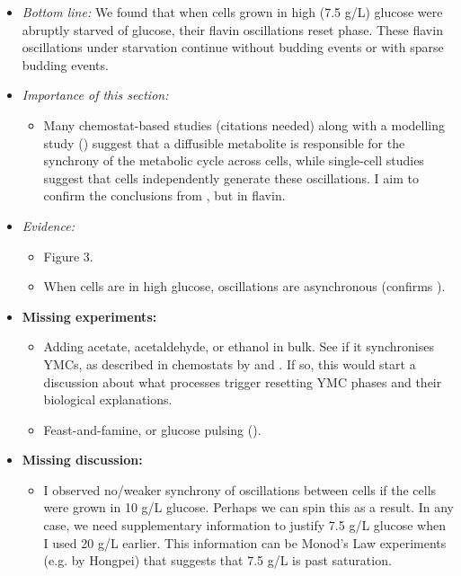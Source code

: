 \begin{itemize}
\item \emph{Bottom line:} We found that when cells grown in high (7.5 g/L) glucose were abruptly starved of glucose, their flavin oscillations reset phase.  These flavin oscillations under starvation continue without budding events or with sparse budding events.
\item \emph{Importance of this section:}

\begin{itemize}
\item Many chemostat-based studies (citations needed) along with a modelling study (\textcite{krishnaMinimalPushPull2018}) suggest that a diffusible metabolite is responsible for the synchrony of the metabolic cycle across cells, while single-cell studies suggest that cells independently generate these oscillations.  I aim to confirm the conclusions from \textcite{papagiannakisAutonomousMetabolicOscillations2017}, but in flavin.
\end{itemize}
\item \emph{Evidence:}
\begin{itemize}
\item Figure 3.
\item When cells are in high glucose, oscillations are asynchronous (confirms \textcite{papagiannakisAutonomousMetabolicOscillations2017,baumgartnerFlavinbasedMetabolicCycles2018}).
\end{itemize}

\item \textbf{Missing experiments:}
\begin{itemize}
\item Adding acetate, acetaldehyde, or ethanol in bulk.  See if it synchronises YMCs, as described in chemostats by \textcite{kuangMsn2RegulateExpression2017} and \textcite{krishnaMinimalPushPull2018} .  If so, this would start a discussion about what processes trigger resetting YMC phases and their biological explanations.
\item Feast-and-famine, or glucose pulsing (\textcite{charvinForcedPeriodicExpression2009}).
\end{itemize}
\item \textbf{Missing discussion:}
\begin{itemize}
\item I observed no/weaker synchrony of oscillations between cells if the cells were grown in 10 g/L glucose.  Perhaps we can spin this as a result.  In any case, we need supplementary information to justify 7.5 g/L glucose when I used 20 g/L earlier.  This information can be Monod's Law experiments (e.g. by Hongpei) that suggests that 7.5 g/L is past saturation.
\end{itemize}
\end{itemize}

